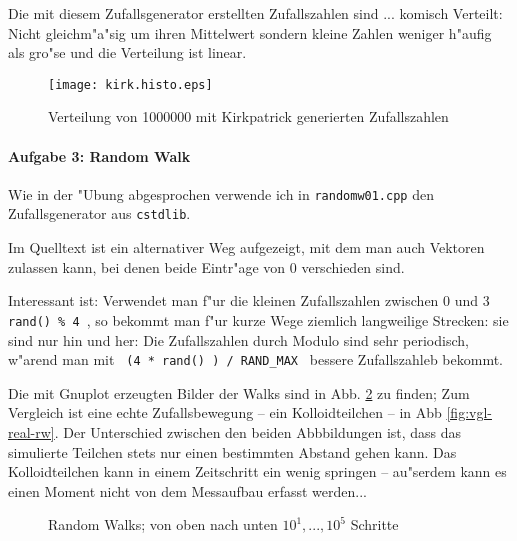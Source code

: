 \documentclass[a4paper,12pt]{article}
\begin{document}
Die mit diesem Zufallsgenerator erstellten Zufallszahlen sind
... komisch Verteilt: Nicht gleichm"a"sig um ihren Mittelwert sondern
kleine Zahlen weniger h"aufig als gro"se und die Verteilung ist linear.


\begin{figure}
  \centering
  \texttt{[image: kirk.histo.eps]}
  \caption{Verteilung von 1000000 mit Kirkpatrick generierten Zufallszahlen}
  \label{fig:kirkp-histo}
\end{figure}


\paragraph{Aufgabe 3: Random Walk}
\label{sec:random_walk}

Wie in der "Ubung abgesprochen verwende ich in \texttt{randomw01.cpp}
den Zufallsgenerator aus \texttt{cstdlib}.

Im Quelltext ist ein alternativer Weg
aufgezeigt, mit dem man  auch Vektoren zulassen kann, bei denen beide Eintr"age von
$0$ verschieden sind.

Interessant ist: Verwendet man f"ur die kleinen Zufallszahlen zwischen
0 und 3 \lstinline| rand() % 4 |, so bekommt man f"ur kurze Wege
                           ziemlich langweilige Strecken: sie sind
                           nur hin und her: Die Zufallszahlen durch
                           Modulo sind sehr periodisch, w"arend man
                           mit
\lstinline| (4 * rand() ) / RAND_MAX | bessere Zufallszahleb bekommt.

Die mit Gnuplot erzeugten Bilder der Walks sind in
Abb. \ref{fig:random-walks} zu finden; Zum Vergleich ist eine echte
Zufallsbewegung -- ein Kolloidteilchen -- in Abb
\ref{fig:vgl-real-rw}. Der Unterschied zwischen den beiden
Abbbildungen ist, dass das simulierte Teilchen stets nur einen
bestimmten Abstand gehen kann. Das Kolloidteilchen kann in einem
Zeitschritt ein wenig springen -- au"serdem kann es einen Moment nicht
von dem Messaufbau erfasst werden...


\begin{figure}
  \centering
  \subfigure{\texttt{[image: rw-10-3]}}
  \subfigure{\texttt{[image: rw-10-4]}}
  \subfigure{\texttt{[image: rw-100-0]}}
  \subfigure{\texttt{[image: rw-100-2]}}
  \subfigure{\texttt{[image: rw-1000-0]}}
  \subfigure{\texttt{[image: rw-1000-2]}}
  \subfigure{\texttt{[image: rw-10000-2]}}
  \subfigure{\texttt{[image: rw-10000-1]}}
  \subfigure{\texttt{[image: rw-100000-2]}}
  \subfigure{\texttt{[image: rw-100000-0]}}
  \caption{Random Walks; von oben nach unten $10^1, ..., 10^5$ Schritte}
  \label{fig:random-walks}
\end{figure}
\end{document}
